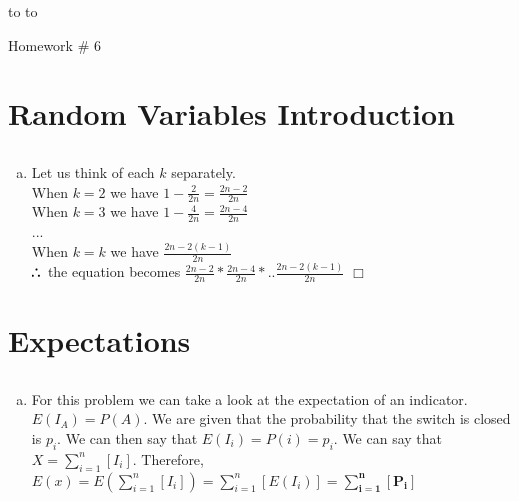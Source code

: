 \documentclass[10pt]{report}
\newenvironment{proof}{\par\noindent{\it Proof.}\hspace*{1em}}{$\Box$\bigskip}
\newcommand{\handout}{
   \renewcommand{\thepage}{}
   \noindent
   \begin{center}
      \vbox{
    \hbox to \columnwidth {\sc{\course} --- \prof \hfill}
    \vspace{-2mm}
    \hbox to \columnwidth {\sc due \MakeLowercase{\duedate} \duelocation \hfill {\LARGE\color{mdb}\yourid}}
      }
   \end{center}
      Homework \# 6
   \vspace*{2mm}
}
\def\therefore{\boldsymbol{\text{ }
\leavevmode
\lower0.4ex\hbox{$\cdot$}
\kern-.5em\raise0.7ex\hbox{$\cdot$}
\kern-0.6em\lower0.4ex\hbox{$\cdot$}
\thinspace\text{ }}}
\begin{document}
\thispagestyle{empty}
\handout

\setcounter{chapter}{3} 
\setcounter{section}{0}
\section{\sc\color{cit}Random Variables Introduction}
\setcounter{subsection}{12}
\subsection{}
 \begin{enumerate}[(a)]
       \item \begin{proof}
       Let us think of each $k$ separately. \\
       When $k=2 $ we have $1 - \frac{2}{2n} = \frac{2n-2}{2n} $ \\
       When $k = 3 $ we have $1 - \frac{4}{2n} = \frac{2n-4}{2n}$ \\
       ... \\
      When $k = k $ we have $\frac{2n-2(k-1)}{2n} $ \\
      $\therefore $ the equation becomes $ \frac{2n-2}{2n} *  \frac{2n-4}{2n} * .. \frac{2n-2(k-1)}{2n}  $
       \end{proof}
    \end{enumerate}
    \setcounter{subsection}{14}
 \section{\sc\color{cit}Expectations}
      \setcounter{subsection}{6}
    \subsection{}
 \begin{enumerate}[(a)]
 \item For this problem we can take a look at the expectation of an indicator. $E(I_A) = P(A) $. We are given that the probability that the switch is closed is $p_i $. We can then say that $E(I_i) = P(i) = p_i $. We can say that $X = \sum_{i=1}^{n}  [I_i]$. Therefore, $E(x) = E(\sum_{i=1}^{n}  [I_i]) = \sum_{i=1}^{n} [E(I_i)] = \mathbf{\sum_{i=1} ^ {n} [P_i]}$
 \end{enumerate}
\end{document}

